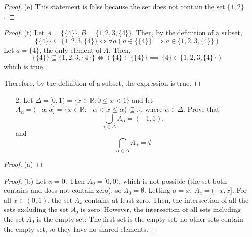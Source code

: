 \documentclass[10pt]{article}
\theoremstyle{definition}
\theoremstyle{plain}
\newcommand{\R}{\mathbb{R}}
\begin{document}
\begin{proof}{(e)}
  This statement is false because the set does not contain the set $\{1,2\}$.
\end{proof}

\begin{proof}{(f)}
  Let $A=\{\{4\}\}, B = \{1,2,3,\{4\}\}$. Then, by the definition of a subset,
  \begin{equation*}
    \{\{4\}\} \subseteq \{1,2,3,\{4\}\} \iff \forall a(a\in \{\{4\}\} \implies a\in \{1,2,3,\{4\}\})
  \end{equation*}
  Let $a=\{4\}$, the only element of $A$. Then,
  \begin{equation*}
      \{\{4\}\} \subseteq \{1,2,3,\{4\}\} \iff (\{4\}\in \{\{4\}\} \implies \{4\}\in \{1,2,3,\{4\}\})
  \end{equation*}
  which is true. \\

  \par Therefore, by the definition of a subset, the expression is true.
\end{proof}



\pagebreak



\begin{enumerate}
  \item[2.] Let $\Delta = [0,1) = \{x \in \R: 0 \leq x < 1\}$ and let $A_\alpha = (-\alpha,\alpha] = \{x \in \R: -\alpha < x \leq \alpha\} \subseteq \R$, where $\alpha \in \Delta$.  Prove that
      $$\bigcup_{\alpha \in \Delta} A_\alpha = (-1,1),$$
   and
      $$\bigcap_{\alpha \in \Delta} A_\alpha = \emptyset$$
\end{enumerate}

\begin{proof}{(a)}

\end{proof}

\begin{proof}{(b)}
 Let $\alpha=0$. Then $A_0=[0,0)$, which is not possible (the set both contains and does not contain zero), so $A_0=\emptyset$. Letting $\alpha=x$, $A_x=(-x,x]$. For all $x\in(0,1)$, the set $A_x$ contains at least zero. Then, the intersection of all the sets excluding the set $A_0$ is zero. However, the intersection of all sets including the set $A_0$ is the empty set: The first set is the empty set, no other sets contain the empty set, so they have no shared elements.
\end{proof}
\end{document}
